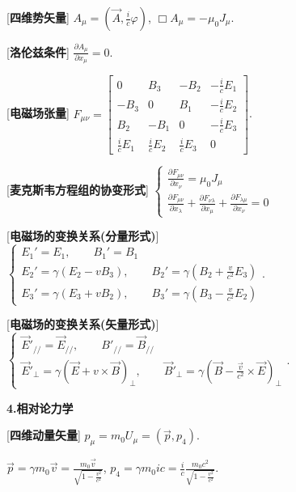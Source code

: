 [\textbf{四维势矢量}] $A_\mu=(\vec A,\frac{i}{c}\varphi)$, $\Box A_\mu=-\mu_0J_\mu$.\par

[\textbf{洛伦兹条件}] $\frac{\partial A_\mu}{\partial x_\mu}=0$.\par

[\textbf{电磁场张量}] $F_{\mu\nu}=\left[\begin{matrix}0&B_3&-B_2&-\frac{i}{c}E_1\\-B_3&0&B_1&-\frac{i}{c}E_2\\B_2&-B_1&0&-\frac{i}{c}E_3\\\frac{i}{c}E_1&\frac{i}{c}E_2&\frac{i}{c}E_3&0\end{matrix}\right]$.\par

[\textbf{麦克斯韦方程组的协变形式}] $\begin{cases}\frac{\partial F_{\mu\nu}}{\partial x_\nu}=\mu_0J_\mu\\\frac{\partial F_{\mu\nu}}{\partial x_\lambda}+\frac{\partial F_{\nu\lambda}}{\partial x_\mu}+\frac{\partial F_{\lambda\mu}}{\partial x_\nu}=0\end{cases}$

[\textbf{电磁场的变换关系(分量形式)}] $\begin{cases}E_1'=E_1,\qquad B_1'=B_1\\E_2'=\gamma(E_2-vB_3),\qquad B_2'=\gamma(B_2+\frac{v}{c^2}E_3)\\E_3'=\gamma(E_3+vB_2),\qquad B_3'=\gamma(B_3-\frac{v}{c^2}E_2)\end{cases}$.\par

\clearpage

[\textbf{电磁场的变换关系(矢量形式)}] $\begin{cases}\vec E'_{//}=\vec E_{//},\qquad B'_{//}=\vec B_{//}\\\vec E'_{\perp}=\gamma(\vec E+v\times\vec B)_{\perp},\qquad \vec B'_{\perp}=\gamma(\vec B-\frac{\vec v}{c^2}\times\vec E)_{\perp}\end{cases}$.\par

\begin{center}
 \textbf{4.相对论力学}
\end{center}

[\textbf{四维动量矢量}] $p_\mu=m_0U_\mu=(\vec p,p_4)$.\par
\qquad $\vec p=\gamma m_0\vec v=\frac{m_0\vec v}{\sqrt{1-\frac{v^2}{c^2}}}$, $p_4=\gamma m_0ic=\frac{i}{c}\frac{m_0c^2}{\sqrt{1-\frac{v^2}{c^2}}}$.\par


